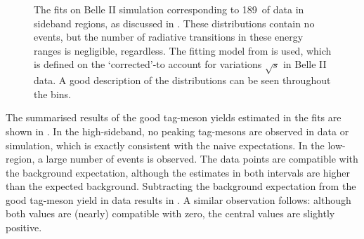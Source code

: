 \begin{figure}[htbp!]
    \centering
    \caption{\label{fig:sideband_mc_fit}    
    The \Mbc fits on Belle II simulation corresponding to 189~\invfb of data in \EB sideband regions,
    as discussed in .
    These distributions contain no \BtoXsgamma events, but the number of radiative transitions in these energy ranges is negligible, regardless.
    The fitting model from  is used,
    which is defined on the `corrected'-\Mbc to account for variations $\sqrt{s}$ in Belle II data.
    A good description of the \Mbc distributions can be seen throughout the \EB bins.
    }
\end{figure}

The summarised results of the good tag-\B meson yields estimated in the \Mbc fits are shown in .
In the high-\EB sideband, no peaking tag-\B mesons are observed in data or simulation, which is exactly consistent with the naive expectations.
In the low-\EB region, a large number of events is observed.
The data points are compatible with the background expectation, although the estimates in both intervals are higher than the expected background.
Subtracting the background expectation from the good tag-\B meson yield in data results in .
A similar observation follows: although both values are (nearly) compatible with zero,
the central values are slightly positive.

